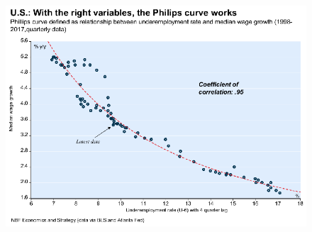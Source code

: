 \documentclass{beamer}
\begin{document}
\begin{frame}
  \begin{figure}
   \includegraphics[scale=.8]{pc5.eps}
  \end{figure}
\end{frame}

\end{document}
